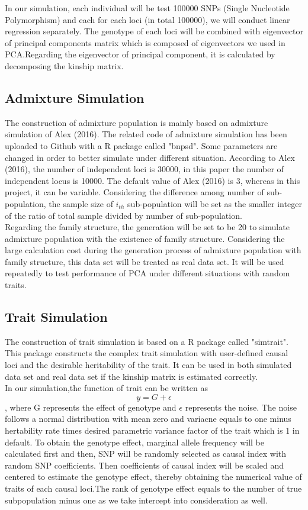 \documentclass[12pt]{article}
\begin{document}
In our simulation, each individual will be test 100000 SNPs (Single Nucleotide Polymorphism) and each for each loci (in total 100000), we will conduct linear regression separately.  The genotype of each loci will be combined with eigenvector of principal components matrix which is composed of eigenvectors we used in PCA.Regarding the eigenvector of principal component, it is calculated by decomposing the kinship matrix.  

\subsection{Admixture Simulation}
The construction of admixture population is mainly based on admixture simulation of Alex (2016). The related code of admixture simulation has been uploaded to Github with a R package called "bnpsd".  Some parameters are changed in order to better simulate under different situation. According to Alex (2016), the number of independent loci is 30000, in this paper the number of independent locus is 10000. The default value of Alex (2016) is 3, whereas in this project, it can be variable. Considering the difference among number of sub-population, the sample size of $i_{th}$ sub-population will be set as the smaller integer of the ratio of total sample divided by number of sub-population.\\
Regarding the family structure, the generation will be set to be 20 to simulate admixture population with the existence of family structure. Considering the large calculation cost during the generation process of admixture population with family structure, this data set will be treated as real data set. It will be used repeatedly to test performance of PCA under different situations with random traits.



\subsection{Trait Simulation}
The construction of trait simulation is based on a R package called "simtrait". This package constructs the complex trait simulation with user-defined causal loci and the desirable heritability of the trait. It can be used in both simulated data set and real data set if the kinship matrix is estimated correctly. \\
In our simulation,the function of trait can be written as $$y=G+ \epsilon$$ 
, where G represents the effect of genotype and $\epsilon$ represents the noise. The noise follows a normal distribution with mean zero and variacne equals to one minus hertability rate times desired parametric variance factor of the trait which is 1 in default. To obtain the genotype effect, marginal allele frequency will be calculated first and then, SNP will be randomly selected as causal index with random SNP coefficients. Then  coefficients of causal index will be scaled and centered to estimate the genotype effect, thereby obtaining the numerical value of traits of each causal loci.The rank of genotype effect equals to the number of true subpopulation minus one as we take intercept into consideration as well.  
\end{document}
